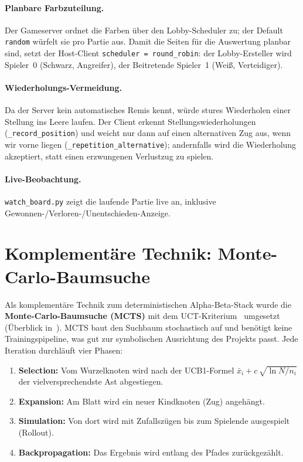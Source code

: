 \documentclass[11pt,a4paper]{article}
\newcommand{\code}[1]{\texttt{\small #1}}
\begin{document}
\paragraph{Planbare Farbzuteilung.}
Der Gameserver ordnet die Farben \"uber den Lobby-Scheduler zu; der Default
\code{random} w\"urfelt sie pro Partie aus.
Damit die Seiten f\"ur die Auswertung planbar sind, setzt der Host-Client
\code{scheduler = round\_robin}: der Lobby-Ersteller wird Spieler~0 (Schwarz,
Angreifer), der Beitretende Spieler~1 (Wei\ss, Verteidiger).

\paragraph{Wiederholungs-Vermeidung.}
Da der Server kein automatisches Remis kennt, w\"urde stures Wiederholen einer
Stellung ins Leere laufen.
Der Client erkennt Stellungswiederholungen (\code{\_record\_position}) und weicht
nur dann auf einen alternativen Zug aus, wenn wir vorne liegen
(\code{\_repetition\_alternative}); andernfalls wird die Wiederholung
akzeptiert, statt einen erzwungenen Verlustzug zu spielen.

\paragraph{Live-Beobachtung.}
\code{watch\_board.py} zeigt die laufende Partie live an, inklusive
Gewonnen-/Verloren-/Unentschieden-Anzeige.

\section{Komplement\"are Technik: Monte-Carlo-Baumsuche}\label{sec:mcts}
Als komplement\"are Technik zum deterministischen Alpha-Beta-Stack wurde die
\textbf{Monte-Carlo-Baumsuche (MCTS)} mit dem UCT-Kriterium~\cite{russell2021}
umgesetzt (\"Uberblick in~\cite{browne2012}).
MCTS baut den Suchbaum stochastisch auf und ben\"otigt keine Trainingspipeline,
was gut zur symbolischen Ausrichtung des Projekts passt.
Jede Iteration durchl\"auft vier Phasen:

\begin{enumerate}[noitemsep]
  \item \textbf{Selection:} Vom Wurzelknoten wird nach der UCB1-Formel
        $\bar{x}_i + c\,\sqrt{\ln N / n_i}$ der vielversprechendste Ast
        abgestiegen.
  \item \textbf{Expansion:} Am Blatt wird ein neuer Kindknoten (Zug) angeh\"angt.
  \item \textbf{Simulation:} Von dort wird mit Zufallsz\"ugen bis zum Spielende
        ausgespielt (Rollout).
  \item \textbf{Backpropagation:} Das Ergebnis wird entlang des Pfades
        zur\"uckgez\"ahlt.
\end{enumerate}
\end{document}
